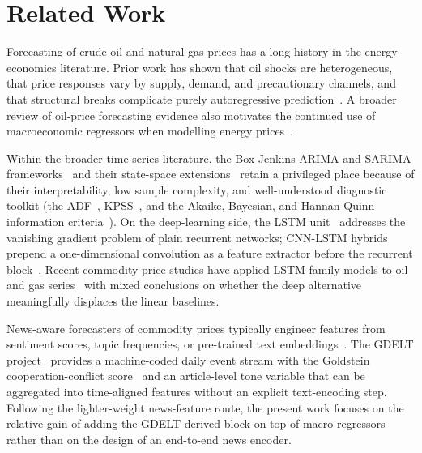 \documentclass[11pt,a4paper]{article}
\begin{document}
\section{Related Work}\label{sec:related}

Forecasting of crude oil and natural gas prices has a long history in the energy-economics literature. Prior work has shown that oil shocks are heterogeneous, that price responses vary by supply, demand, and precautionary channels, and that structural breaks complicate purely autoregressive prediction~\citep{hamilton2009causes, hamilton2003what, kilian2009not}. A broader review of oil-price forecasting evidence also motivates the continued use of macroeconomic regressors when modelling energy prices~\citep{baumeister2016forty}.

Within the broader time-series literature, the Box-Jenkins ARIMA and SARIMA frameworks~\citep{box1976time} and their state-space extensions~\citep{durbin2012time} retain a privileged place because of their interpretability, low sample complexity, and well-understood diagnostic toolkit (the ADF~\citep{dickey1979distribution}, KPSS~\citep{kwiatkowski1992testing}, and the Akaike, Bayesian, and Hannan-Quinn information criteria~\citep{akaike1974new}). On the deep-learning side, the LSTM unit~\citep{hochreiter1997long, gers2000learning} addresses the vanishing gradient problem of plain recurrent networks; CNN-LSTM hybrids prepend a one-dimensional convolution as a feature extractor before the recurrent block~\citep{lecun1998gradient, sainath2015convolutional, kim2019predicting}. Recent commodity-price studies have applied LSTM-family models to oil and gas series~\citep{cen2019crude, busari2021crude} with mixed conclusions on whether the deep alternative meaningfully displaces the linear baselines.

News-aware forecasters of commodity prices typically engineer features from sentiment scores, topic frequencies, or pre-trained text embeddings~\citep{tetlock2007giving, baker2016measuring, shapiro2022measuring, li2014news}. The GDELT project~\citep{leetaru2013gdelt} provides a machine-coded daily event stream with the Goldstein cooperation-conflict score~\citep{goldstein1992conflict} and an article-level tone variable that can be aggregated into time-aligned features without an explicit text-encoding step. Following the lighter-weight news-feature route, the present work focuses on the relative gain of adding the GDELT-derived block on top of macro regressors rather than on the design of an end-to-end news encoder.
\end{document}
